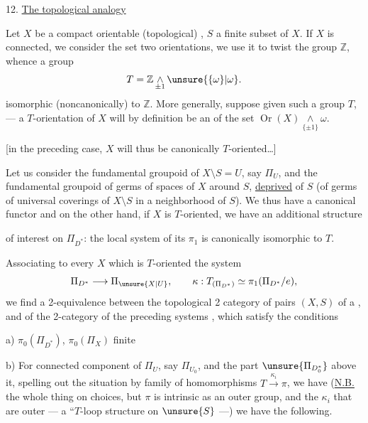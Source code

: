
12. \uline{The topological analogy}

Let \(X\) be a compact
orientable (topological) , \(S\) a finite subset of \(X\). If \(X\) is connected, we consider
the set \inserted{\unsure{\(\omega\)}}  two orientations,
we use it to twist the group \(\mathbb Z\), whence a group 
\[
T=\mathbb Z\mathop{\wedge}\limits_{\pm1}\unsure{\{\omega\}|\omega}.
\]
isomorphic (noncanonically) to \(\mathbb Z\). More generally, suppose
given such a group \(T\),
--- a \(T\)-orientation of \(X\) will by definition be an 
of the set \(\operatorname{Or}(X)\mathop{\wedge}\limits_{\{\pm1\}}\omega\).

[in the preceding case, \(X\) will thus be canonically \(T\)-oriented\ldots]

Let us consider the fundamental groupoid of \(X\setminus S=U\), say \(\Pi_U\),
and the fundamental groupoid  of germs
of spaces of \(X\) around \(S\), \uline{deprived} of \(S\)
(of germs of universal coverings of \(X\setminus S\) in a neighborhood of \(S\)).
We thus have a canonical functor
and on the other hand,  if \(X\) is \(T\)-oriented, we have an
additional structure



of interest on  \(\Pi_{D^*}\): the local system of
its \(\pi_1\) is canonically isomorphic to \(T\).

Associating to every \(X\) which is \(T\)-oriented the system
\[
\Pi_{D^*}\longrightarrow\Pi_{\unsure{X|U}},\qquad
\kappa:T_{(\Pi_{D^*})}\simeq\pi_1(\Pi_{D^*}/e),
\]
we find a 2-equivalence between the topological 2 category of
 pairs \((X,S)\) of a
, and of the 2-category of the preceding
systems , \unsure{(}which satisfy the conditions

a) \(\pi_0(\Pi_{D^*})\),  \(\pi_0(\Pi_X)\) finite

b) For  connected component of \(\Pi_U\), say
\(\Pi_{U_0}\), and the part \(\unsure{\Pi_{D_0^*}}\) above it, spelling out the
 situation by 
 family of homomorphisms
\(T\xrightarrow{\kappa_i}\pi\), we have (\uline{N.B.} the whole thing  on choices,
but \(\pi\) is intrinsic as an outer group, and the \(\kappa_i\)
 that are outer ---  a ``\(T\)-loop structure
on \(\unsure{S}\) ---) we have the following.

